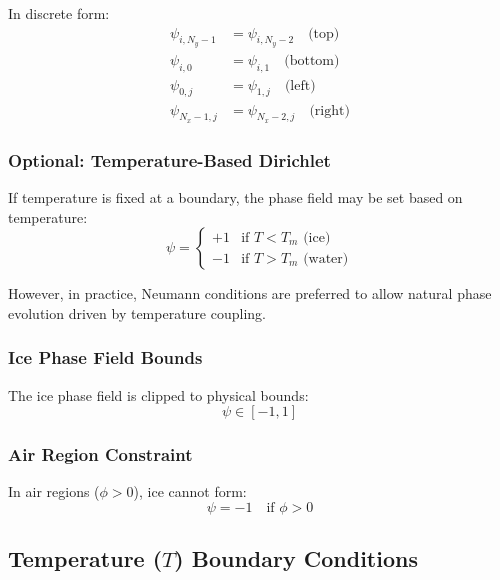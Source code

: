 \documentclass[12pt]{article}
\begin{document}
In discrete form:
\begin{align}
\psi_{i,N_y-1} &= \psi_{i,N_y-2} \quad \text{(top)} \\
\psi_{i,0} &= \psi_{i,1} \quad \text{(bottom)} \\
\psi_{0,j} &= \psi_{1,j} \quad \text{(left)} \\
\psi_{N_x-1,j} &= \psi_{N_x-2,j} \quad \text{(right)}
\end{align}

\subsubsection{Optional: Temperature-Based Dirichlet}

If temperature is fixed at a boundary, the phase field may be set based on temperature:
\begin{equation}
\psi = \begin{cases}
+1 & \text{if } T < T_m \text{ (ice)} \\
-1 & \text{if } T > T_m \text{ (water)}
\end{cases}
\label{eq:ice_temperature_bc}
\end{equation}

However, in practice, Neumann conditions are preferred to allow natural phase evolution driven by temperature coupling.

\subsubsection{Ice Phase Field Bounds}

The ice phase field is clipped to physical bounds:
\begin{equation}
\psi \in [-1, 1]
\label{eq:ice_bounds}
\end{equation}

\subsubsection{Air Region Constraint}

In air regions ($\phi > 0$), ice cannot form:
\begin{equation}
\psi = -1 \quad \text{if } \phi > 0
\label{eq:ice_air_constraint}
\end{equation}

\subsection{Temperature ($T$) Boundary Conditions}
\end{document}
